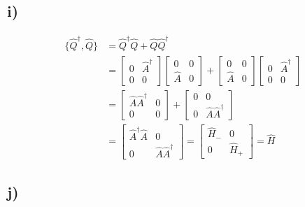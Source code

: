 \documentclass[norsk,a4paper,12pt]{article}
\begin{document}
\subsection*{i)}
\begin{equation}
\begin{aligned}
	\{\hat{Q}^\dagger,\hat{Q}\} &= \hat{Q}^\dagger \hat{Q} + \hat{Q} \hat{Q}^\dagger \\
	&= \left[ \begin{matrix} 0 & \hat A^\dagger \\ 0 & 0 \end{matrix} \right] \left[\begin{matrix} 0 & 0 \\ \hat A&0 \end{matrix}\right] + \left[\begin{matrix} 0 & 0 \\ \hat A&0 \end{matrix}\right] \left[ \begin{matrix} 0 & \hat A^\dagger \\ 0 & 0 \end{matrix} \right] \\
	&= \left[ \begin{matrix} \hat{A}\hat{A}^\dagger & 0 \\ 0 & 0 \end{matrix} \right] + \left[ \begin{matrix} 0 & 0 \\ 0 & \hat{A}\hat{A}^\dagger \end{matrix} \right] \\
	&= \left[ \begin{matrix} \hat{A}^\dagger\hat{A} & 0 \\ 0 & \hat{A}\hat{A}^\dagger \end{matrix} \right] = \left[ \begin{matrix} \hat{H}_- & 0 \\ 0 & \hat{H}_+ \end{matrix} \right] = \hat{H}
\end{aligned}
\end{equation}

\subsection*{j)}
\end{document}
